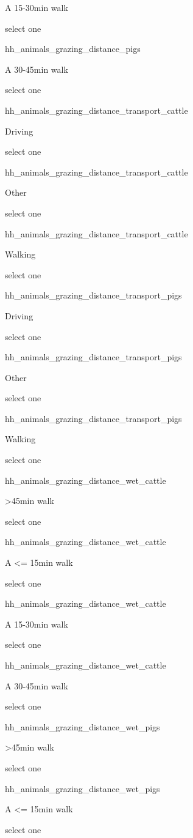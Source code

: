 \documentclass[]{article}
\begin{document}
A 15-30min walk

select one

hh\_animals\_grazing\_distance\_pigs

A 30-45min walk

select one

hh\_animals\_grazing\_distance\_transport\_cattle

Driving

select one

hh\_animals\_grazing\_distance\_transport\_cattle

Other

select one

hh\_animals\_grazing\_distance\_transport\_cattle

Walking

select one

hh\_animals\_grazing\_distance\_transport\_pigs

Driving

select one

hh\_animals\_grazing\_distance\_transport\_pigs

Other

select one

hh\_animals\_grazing\_distance\_transport\_pigs

Walking

select one

hh\_animals\_grazing\_distance\_wet\_cattle

\textgreater{}45min walk

select one

hh\_animals\_grazing\_distance\_wet\_cattle

A \textless{}= 15min walk

select one

hh\_animals\_grazing\_distance\_wet\_cattle

A 15-30min walk

select one

hh\_animals\_grazing\_distance\_wet\_cattle

A 30-45min walk

select one

hh\_animals\_grazing\_distance\_wet\_pigs

\textgreater{}45min walk

select one

hh\_animals\_grazing\_distance\_wet\_pigs

A \textless{}= 15min walk

select one
\end{document}
